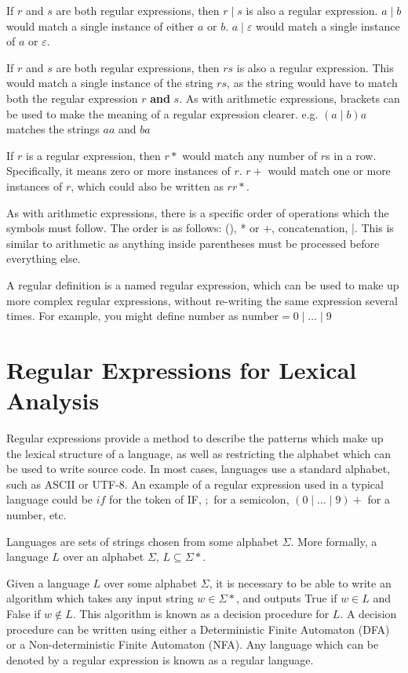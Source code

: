 If $r$ and $s$ are both regular expressions, then $r \mid s$ is also a regular expression. $a \mid b$ would match a
 single instance of either $a$ or $b$. $a \mid \varepsilon$ would match a single instance of $a$ or $\varepsilon$.

If $r$ and $s$ are both regular expressions, then $rs$ is also a regular expression. This would match a single instance
 of the string $rs$, as the string would have to match both the regular expression $r$ \textbf{and} $s$. As with
 arithmetic expressions, brackets can be used to make the meaning of a regular expression clearer. e.g. $(a \mid b)a$
 matches the strings $aa$ and $ba$

If $r$ is a regular expression, then $r*$ would match any number of $r$s in a row. Specifically, it means zero or more
 instances of $r$. $r+$ would match one or more instances of $r$, which could also be written as $rr*$.

As with arithmetic expressions, there is a specific order of operations which the symbols must follow. The order is as
 follows: (), * or +, concatenation, |. This is similar to arithmetic as anything inside parentheses must be processed
 before everything else.

A regular definition is a named regular expression, which can be used to make up more complex regular expressions,
 without re-writing the same expression several times. For example, you might define number as
 $\mathrm{number} = 0 \mid \dots \mid 9$

\section*{Regular Expressions for Lexical Analysis}

Regular expressions provide a method to describe the patterns which make up the lexical structure of a language, as
 well as restricting the alphabet which can be used to write source code. In most cases, languages use a standard
 alphabet, such as ASCII or UTF-8. An example of a regular expression used in a typical language could be $if$ for the
 token of IF, $;$ for a semicolon, $(0 \mid \dots \mid 9)+$ for a number, etc.

Languages are sets of strings chosen from some alphabet $\Sigma$. More formally, a language $L$ over an alphabet
 $\Sigma$, $L \subseteq \Sigma*$.

Given a language $L$ over some alphabet $\Sigma$, it is necessary to be able to write an algorithm which takes any
 input string $w \in \Sigma*$, and outputs True if $w \in L$ and False if $w \notin L$. This algorithm is known as a
 decision procedure for $L$. A decision procedure can be written using either a Deterministic Finite Automaton (DFA) or
 a Non-deterministic Finite Automaton (NFA). Any language which can be denoted by a regular expression is known as a
 regular language.
